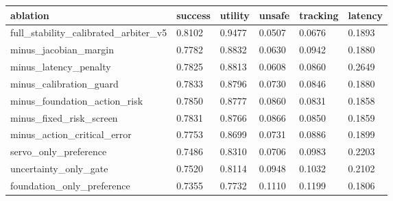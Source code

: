 \begin{tabular}{llllll}
\toprule
ablation & success & utility & unsafe & tracking & latency \\
\midrule
full\_stability\_calibrated\_arbiter\_v5 & 0.8102 & 0.9477 & 0.0507 & 0.0676 & 0.1893 \\
minus\_jacobian\_margin & 0.7782 & 0.8832 & 0.0630 & 0.0942 & 0.1880 \\
minus\_latency\_penalty & 0.7825 & 0.8813 & 0.0608 & 0.0860 & 0.2649 \\
minus\_calibration\_guard & 0.7833 & 0.8796 & 0.0730 & 0.0846 & 0.1880 \\
minus\_foundation\_action\_risk & 0.7850 & 0.8777 & 0.0860 & 0.0831 & 0.1858 \\
minus\_fixed\_risk\_screen & 0.7831 & 0.8766 & 0.0866 & 0.0850 & 0.1859 \\
minus\_action\_critical\_error & 0.7753 & 0.8699 & 0.0731 & 0.0886 & 0.1899 \\
servo\_only\_preference & 0.7486 & 0.8310 & 0.0706 & 0.0983 & 0.2203 \\
uncertainty\_only\_gate & 0.7520 & 0.8114 & 0.0948 & 0.1032 & 0.2102 \\
foundation\_only\_preference & 0.7355 & 0.7732 & 0.1110 & 0.1199 & 0.1806 \\
\bottomrule
\end{tabular}
